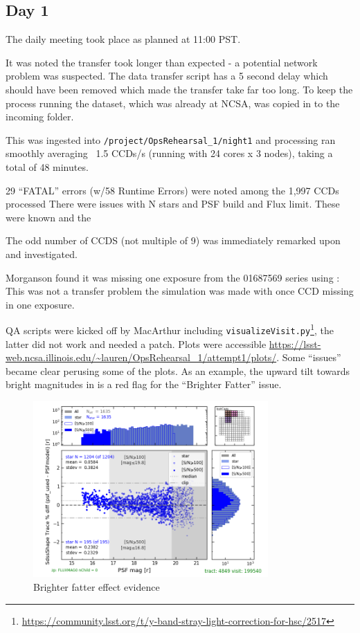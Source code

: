 \subsection{Day 1} \label{sec:day1}


The daily meeting took place as planned at 11:00 \gls{PST}.

It was noted the transfer took longer than expected - a potential network problem was suspected.
The data transfer script has a 5 second delay which should have been removed which made the transfer take far too long.
To keep the process running the dataset, which was already at \gls{NCSA}, was copied in to the incoming folder.

This was ingested into \texttt{/project/OpsRehearsal\_1/night1}  and
processing ran  smoothly  averaging  ~1.5 CCDs/s  (running with 24 cores x 3 nodes), taking a total of 48 minutes.


29 “FATAL” errors (w/58 Runtime Errors) were noted among the 1,997 CCDs processed
There were issues with N stars and \gls{PSF} build and  Flux limit. These were known and the

The odd number of CCDS (not multiple of 9) was immediately remarked upon and investigated.

Morganson found it was  missing one exposure from the 01687569 series using :
This was not a transfer problem the simulation was made with once \gls{CCD} missing in one exposure.

QA scripts were kicked off by MacArthur including \texttt{visualizeVisit.py}\footnote{\url{https://community.lsst.org/t/y-band-stray-light-correction-for-hsc/2517}}, the latter did not work and needed a patch.
Plots were accessible \url{https://lsst-web.ncsa.illinois.edu/~lauren/OpsRehearsal_1/attempt1/plots/}.
Some “issues” became clear perusing some of the plots.  As an example, the upward tilt towards bright magnitudes in  is a red flag for the “Brighter Fatter” issue.


\begin{figure}
\includegraphics[width=0.8\textwidth]{plots/plot-v199540-psfTraceDiff-psfMagHist}
\caption{Brighter fatter effect evidence }
\label{fig:bfp}
\end{figure}



